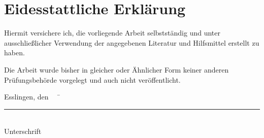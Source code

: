 \chapter*{Eidesstattliche Erklärung}

Hiermit versichere ich, die vorliegende Arbeit selbstständig und unter ausschließlicher Verwendung der angegebenen Literatur und Hilfsmittel erstellt zu haben.

Die Arbeit wurde bisher in gleicher oder Ähnlicher Form keiner anderen Prüfungsbehörde vorgelegt und auch nicht veröffentlicht.

\begin{tabbing}
          Esslingen, den \workDatum ~~	\= \rule{5cm}{0.3mm}\\
                                                                                                    \> Unterschrift
\end{tabbing}
